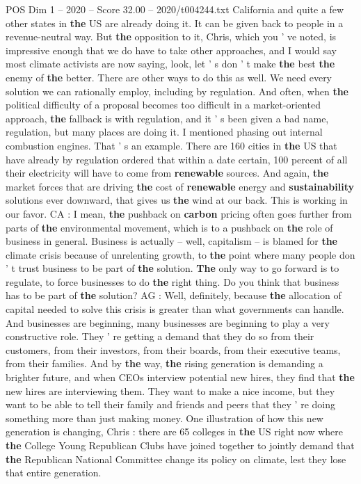 \begin{textsample}{POS Dim 1 – 2020 – Score 32.00 – 2020/t004244.txt}
California and quite a few other states in \textbf{the} US are already doing it.
It can be given back to people in a revenue-neutral way.
But \textbf{the} opposition to it, Chris, which you ' ve noted, is impressive enough that we do have to take other approaches, and I would say most climate activists are now saying, look, let ' s don ' t make \textbf{the} best \textbf{the} enemy of \textbf{the} better.
There are other ways to do this as well.
We need every solution we can rationally employ, including by regulation.
And often, when \textbf{the} political difficulty of a proposal becomes too difficult in a market-oriented approach, \textbf{the} fallback is with regulation, and it ' s been given a bad name, regulation, but many places are doing it.
I mentioned phasing out internal combustion engines.
That ' s an example.
There are 160 cities in \textbf{the} US that have already by regulation ordered that within a date certain, 100 percent of all their electricity will have to come from \textbf{renewable} sources.
And again, \textbf{the} market forces that are driving \textbf{the} cost of \textbf{renewable} energy and \textbf{sustainability} solutions ever downward, that gives us \textbf{the} wind at our back.
This is working in our favor.
CA : I mean, \textbf{the} pushback on \textbf{carbon} pricing often goes further from parts of \textbf{the} environmental movement, which is to a pushback on \textbf{the} role of business in general.
Business is actually -- well, capitalism -- is blamed for \textbf{the} climate crisis because of unrelenting growth, to \textbf{the} point where many people don ' t trust business to be part of \textbf{the} solution. \textbf{The} only way to go forward is to regulate, to force businesses to do \textbf{the} right thing.
Do you think that business has to be part of \textbf{the} solution?
AG : Well, definitely, because \textbf{the} allocation of capital needed to solve this crisis is greater than what governments can handle.
And businesses are beginning, many businesses are beginning to play a very constructive role.
They ' re getting a demand that they do so from their customers, from their investors, from their boards, from their executive teams, from their families.
And by \textbf{the} way, \textbf{the} rising generation is demanding a brighter future, and when CEOs interview potential new hires, they find that \textbf{the} new hires are interviewing them.
They want to make a nice income, but they want to be able to tell their family and friends and peers that they ' re doing something more than just making money.
One illustration of how this new generation is changing, Chris : there are 65 colleges in \textbf{the} US right now where \textbf{the} College Young Republican Clubs have joined together to jointly demand that \textbf{the} Republican National Committee change its policy on climate, lest they lose that entire generation.

\end{textsample}
